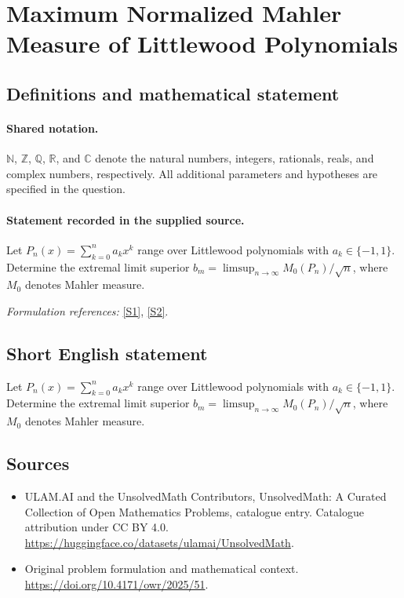 \documentclass[11pt]{article}
\newcommand{\sref}[2]{\hyperlink{source:#1:#2}{[S#2]}}
\begin{document}
\section{Maximum Normalized Mahler Measure of Littlewood Polynomials}\label{statement}

\subsection{Definitions and mathematical statement}

\paragraph{Shared notation.}$\mathbb N$, $\mathbb Z$, $\mathbb Q$, $\mathbb R$, and $\mathbb C$ denote the natural numbers, integers, rationals, reals, and complex numbers, respectively. All additional parameters and hypotheses are specified in the question.


\paragraph{Statement recorded in the supplied source.}
Let $P_n(x)=\sum_{k=0}^n a_kx^k$ range over Littlewood polynomials with $a_k\in\{-1,1\}$. Determine the extremal limit superior $b_m=\limsup_{n\to\infty}M_0(P_n)/\sqrt{n}$, where $M_0$ denotes Mahler measure.
\par\smallskip\textit{Formulation references:} \sref{statement}{1}, \sref{statement}{2}.
\subsection{Short English statement}
Let $P_n(x)=\sum_{k=0}^n a_kx^k$ range over Littlewood polynomials with $a_k\in\{-1,1\}$. Determine the extremal limit superior $b_m=\limsup_{n\to\infty}M_0(P_n)/\sqrt{n}$, where $M_0$ denotes Mahler measure.
\subsection{Sources}
\begin{itemize}
\item[\hypertarget{source:statement:1}{S1}] ULAM.AI and the UnsolvedMath Contributors, UnsolvedMath: A Curated Collection of Open Mathematics Problems, catalogue entry. Catalogue attribution under CC BY 4.0.
\url{https://huggingface.co/datasets/ulamai/UnsolvedMath}.
\item[\hypertarget{source:statement:2}{S2}] Original problem formulation and mathematical context.
\url{https://doi.org/10.4171/owr/2025/51}.
\end{itemize}
\label{end:statement}
\end{document}
